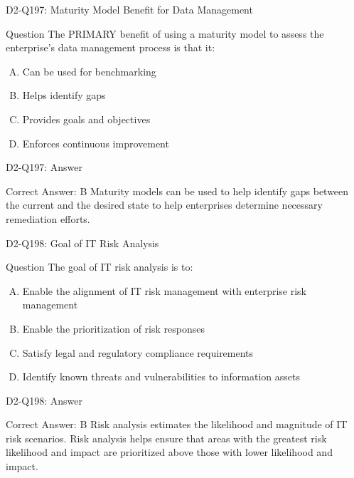 \documentclass{beamer}
\begin{document}
	\begin{frame}{D2-Q197: Maturity Model Benefit for Data Management}
		\begin{block}{Question}
			The PRIMARY benefit of using a maturity model to assess the enterprise's data management process is that it:
		\end{block}
		\begin{enumerate}[(A)]
			\item Can be used for benchmarking
			\item Helps identify gaps
			\item Provides goals and objectives
			\item Enforces continuous improvement
		\end{enumerate}
	\end{frame}
	\begin{frame}{D2-Q197: Answer}
		\begin{block}{Correct Answer: B}
			Maturity models can be used to help identify gaps between the current and the desired state to help enterprises determine necessary remediation efforts.
		\end{block}
	\end{frame}
	
	\begin{frame}{D2-Q198: Goal of IT Risk Analysis}
		\begin{block}{Question}
			The goal of IT risk analysis is to:
		\end{block}
		\begin{enumerate}[(A)]
			\item Enable the alignment of IT risk management with enterprise risk management
			\item Enable the prioritization of risk responses
			\item Satisfy legal and regulatory compliance requirements
			\item Identify known threats and vulnerabilities to information assets
		\end{enumerate}
	\end{frame}
	\begin{frame}{D2-Q198: Answer}
		\begin{block}{Correct Answer: B}
			Risk analysis estimates the likelihood and magnitude of IT risk scenarios. Risk analysis helps ensure that areas with the greatest risk likelihood and impact are prioritized above those with lower likelihood and impact.
		\end{block}
	\end{frame}
	
\end{document}
